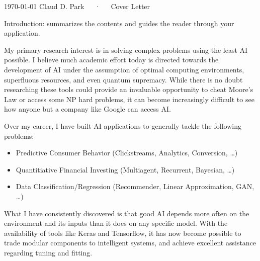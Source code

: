 \documentclass[11pt, a4paper]{awesome-cv}
\begin{document}
\makecvheader[R]

\makecvfooter
  {\today}
  {Claud D. Park~~~·~~~Cover Letter}
  {}

\makelettertitle

\begin{cvletter}


Introduction: summarizes the contents and guides the reader through your application.

My primary research interest is in solving complex problems using the least AI possible. I believe much academic effort today is directed towards the development of AI under the assumption of optimal computing environments, superfluous resources, and even quantum supremacy. While there is no doubt researching these tools could provide an invaluable opportunity to cheat Moore's Law or access some NP hard problems, it can become increasingly difficult to see how anyone but a company like Google can access AI.

Over my career, I have built AI applications to generally tackle the following problems:
\begin{itemize}
\item Predictive Consumer Behavior (Clickstreams, Analytics, Conversion, \ldots{})
\item Quantitiative Financial Investing (Multiagent, Recurrent, Bayesian, \ldots{})
\item Data Classification/Regression (Recommender, Linear Approximation, GAN, \ldots{})
\end{itemize}

What I have consistently discovered is that good AI depends more often on the environment and its inputs than it does on any specific model. With the availability  of tools like Keras and Tensorflow, it has now become possible to trade modular components to intelligent systems, and achieve excellent assistance regarding tuning and fitting.


\end{cvletter}
\end{document}
